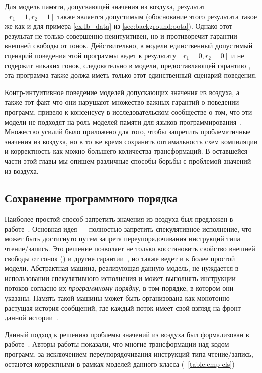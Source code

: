 Для модель памяти, допускающей значения из воздуха, 
результат ${[r_1=1, r_2=1]}$ также является допустимым
(обоснование этого результата такое же как и для 
примера \ref{ex:lb+data} из \cref{sec:background:oota}).
Однако этот результат не только совершенно неинтуитивен, 
но и противоречит гарантии внешней свободы от гонок. 
Действительно, в модели \SC единственный допустимый 
сценарий поведения этой программы ведет к результату $[r_1=0, r_2=0]$ 
и не содержит никаких гонок, следовательно 
в модели, предоставляющей гарантию \eDRF, 
эта программа также должа иметь только этот единственный 
сценарий поведения. 

Контр-интуитивное поведение моделей 
допускающих значения из воздуха, 
а также тот факт что они нарушают множество 
важных гарантий о поведении программ, 
привело к консенсусу в исследовательском сообществе о том, 
что эти модели не подходят на роль моделей памяти 
для языков программирования~\cite{Boehm-Demsky:MSPC14, Batty-al:ESOP15}.  
Множество усилий было приложено для того, 
чтобы запретить проблематичные значения из воздуха, 
но в то же время сохранить оптимальность схем 
компиляции и корректность как можно большего количества трансформаций. 
В оставшейся части этой главы мы опишем различные 
способы борьбы с проблемой значений из воздуха. 

\subsection{Сохранение программного порядка}
\label{sec:analysis:porf}

Наиболее простой способ запретить значения из воздуха 
был предложен в работе~\cite{Boehm-Demsky:MSPC14}.
Основная идея --- полностью запретить спекулятивное исполнение, 
что может быть достигнуто путем запрета переупорядочивания 
инструкций типа чтение/запись. 
Это решение позволяет не только восстановить 
свойство внешней свободы от гонок (\eDRF) 
и другие гарантии~\cite{Lahav-al:PLDI17}, 
но также ведет и к более простой модели. 
Абстрактная машина, реализующая данную модель, 
не нуждается в использовании спекулятивного исполнения
и может выполнять инструкции потоков согласно их
\emph{программному порядку}, \ie в том порядке, в котором они указаны. 
Память такой машины может быть организована 
как монотонно растущая история сообщений, 
где каждый поток имеет свой взгляд на 
фронт данной истории~\cite{Dolan-al:PLDI18, Doherty-al:PPoPP19}. 

Данный подход к решению проблемы значений из воздуха 
был формализован в работе~\cite{Lahav-al:PLDI17}.
Авторы работы показали, что многие трансформации над 
кодом программ, за исключением переупорядочивания 
инструкций типа чтение/запись, остаются корректными в рамках 
моделей данного класса (\see~\cref{table:cmp-cls})

